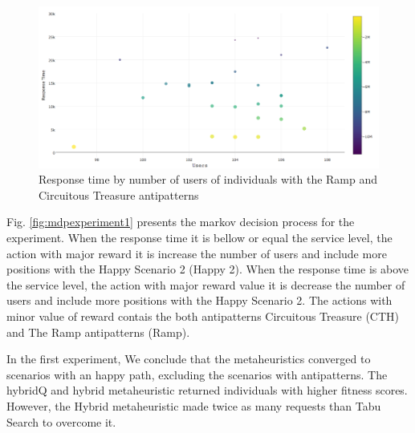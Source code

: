 \begin{figure}[H]
\centering
\includegraphics[width=1\textwidth]{./images/experiment1-8.png}
\caption{Response time by number of users of individuals with the Ramp and Circuitous Treasure antipatterns}
\label{fig:fitnessgenerationalltests1-1}

\end{figure}

Fig. \ref{fig:mdpexperiment1} presents the markov decision process for the experiment. When the response time it is bellow or equal the service level, the action with major reward it is increase the number of users and include more positions with the Happy Scenario 2 (Happy 2). When the response time is above the service level, the action with major reward value it is decrease the number of users and include more positions with the Happy Scenario 2. The actions  with minor value of reward contais the both antipatterns Circuitous Treasure (CTH) and The Ramp antipatterns (Ramp).

In the first experiment, We conclude that the metaheuristics converged to scenarios with an happy path, excluding the scenarios with antipatterns. The hybridQ and hybrid metaheuristic returned individuals with higher fitness scores. However, the Hybrid metaheuristic made twice as many requests than Tabu Search to overcome it. 

